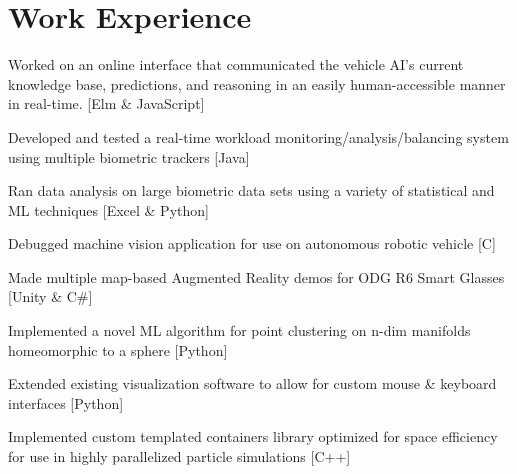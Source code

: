 \documentclass[letterpaper]{headers} %
\begin{document}
\begin{minipage}[t]{0.66\textwidth}

\section{Work Experience}
	
	\vspace{\topsep}
	\begin{tightitemize}
		\item Worked on an online interface that communicated the vehicle AI's current knowledge base, predictions, and reasoning in an easily human-accessible manner in real-time. [Elm \& JavaScript]
	\end{tightitemize}

	\sectionspace

	\begin{tightitemize}
		\item Developed and tested a real-time workload monitoring/analysis/balancing system using multiple biometric trackers [Java]
		\item Ran data analysis on large biometric data sets using a variety of statistical and ML techniques [Excel \& Python]
		\item Debugged machine vision application for use on autonomous robotic vehicle [C]
		\item Made multiple map-based Augmented Reality demos for ODG R6 Smart Glasses [Unity \& C\#]
	\end{tightitemize}
	
	\sectionspace
	
	\begin{tightitemize}
		\item Implemented a novel ML algorithm for point clustering on n-dim manifolds homeomorphic to a sphere [Python]
		\item Extended existing visualization software to allow for custom mouse \& keyboard interfaces [Python]
		\item Implemented custom templated containers library optimized for space efficiency for use in highly parallelized particle simulations [C++]
	\end{tightitemize}
	


\end{minipage}
\end{document}
